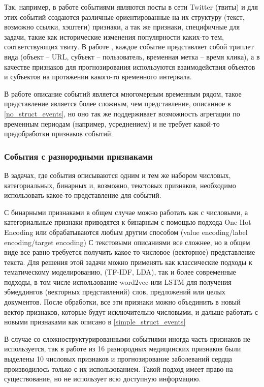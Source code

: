Так, например, в работе \cite{twitter_predicting} событиями являются посты в сети Twitter (твиты) и для этих событий создаются различные ориентированные на их структуру (текст, возможно ссылки, хэштеги) признаки, а так же признаки, специфичные для задачи, такие как исторические изменения популярности каких-то тем, соответствующих твиту. 
В работе \cite{triplet_event_forecasting}, каждое событие представляет собой триплет вида (объект -- URL, субъект -- пользователь, временная метка -- время клика), а в качестве признаков для прогнозирования используются взаимодействия объектов и субъектов на протяжении какого-то временного интервала.

В работе \cite{uber_mulitvar_forecasting} описание событий является многомерным временным рядом, такое представление является более сложным, чем представление, описанное в \ref{no_struct_events}, но оно так же поддерживает возможность агрегации по временным периодам (например, усреднением) и не требует какой-то предобработки признаков событий.

\subsubsection{События с разнородными признаками}
В задачах, где события описываются одним и тем же набором числовых, категориальных, бинарных и, возможно, текстовых признаков, необходимо использовать какое-то представление для событий.

С бинарными признаками в общем случае можно работать как с числовыми, а категориальные признаки приводятся к бинарным с помощью подхода One-Hot Encoding или обрабатываются любым другим способом (value encoding/label encoding/target encoding)
С текстовыми описаниями все сложнее, но в общем виде все равно требуется получить какое-то числовое (векторное) представление текста. Для решения этой задачи можно применять как классические подходы к тематическому моделированию, (TF-IDF, LDA), так и более современные подходы, в том числе использование word2vec или LSTM для получения эбмеддингов (векторных представлений) слов, предложений или целых документов.
После обработки, все эти признаки можно объединить в новый вектор признаков, которые будут исключительно числовыми, и дальше работать с новыми признаками как описано в \ref{simple_struct_events}

В случае со сложноструктурированными событиями иногда часть признаков не используется, так в работе \cite{comparison_coronary_heart_disease} из 16 разнородных медицинских признаков были выделены 10 числовых признаков и прогнозирование заболеваний сердца производилось только с их использованием. Такой подход имеет право на существование, но не использует всю доступную информацию.

